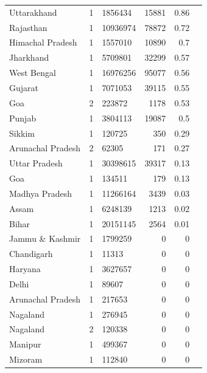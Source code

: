 \documentclass{article}
\begin{document}
\begin{table}[h!]
{\begin{tabular}{|l|l|l|r|r|r|}
		Uttarakhand                    & 1 & 1856434  & 15881   & 0.86  \\
		Rajasthan                      & 1 & 10936974 & 78872   & 0.72  \\
		Himachal Pradesh               & 1 & 1557010  & 10890   & 0.7   \\
		Jharkhand                      & 1 & 5709801  & 32299   & 0.57  \\
		West Bengal                    & 1 & 16976256 & 95077   & 0.56  \\
		Gujarat                        & 1 & 7071053  & 39115   & 0.55  \\
		Goa                            & 2 & 223872   & 1178    & 0.53  \\
		Punjab                         & 1 & 3804113  & 19087   & 0.5   \\
		Sikkim                         & 1 & 120725   & 350     & 0.29  \\
		Arunachal Pradesh              & 2 & 62305    & 171     & 0.27  \\
		Uttar Pradesh                  & 1 & 30398615 & 39317   & 0.13  \\
		Goa                            & 1 & 134511   & 179     & 0.13  \\
		Madhya Pradesh                 & 1 & 11266164 & 3439    & 0.03  \\
		Assam                          & 1 & 6248139  & 1213    & 0.02  \\
		Bihar                          & 1 & 20151145 & 2564    & 0.01  \\
		Jammu \& Kashmir               & 1 & 1799259  & 0       & 0     \\
		Chandigarh                     & 1 & 11313    & 0       & 0     \\
		Haryana                        & 1 & 3627657  & 0       & 0     \\
		Delhi                          & 1 & 89607    & 0       & 0     \\
		Arunachal Pradesh              & 1 & 217653   & 0       & 0     \\
		Nagaland                       & 1 & 276945   & 0       & 0     \\
		Nagaland                       & 2 & 120338   & 0       & 0     \\
		Manipur                        & 1 & 499367   & 0       & 0     \\
		Mizoram                        & 1 & 112840   & 0       & 0     \\

\end{tabular}}
\end{table}
\end{document}
